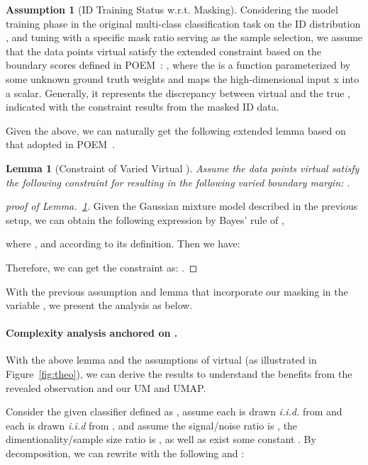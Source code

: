 \documentclass{article}
\theoremstyle{plain}
\newtheorem{lemma}[theorem]{Lemma}
\theoremstyle{definition}
\newtheorem{assumption}[theorem]{Assumption}
\theoremstyle{remark}
\begin{document}
\begin{assumption}[ID Training Status w.r.t. Masking]
Considering the model training phase in the original multi-class classification task on the ID distribution , and tuning with a specific mask ratio serving as the sample selection, we assume that the data points  virtual  satisfy the extended constraint based on the boundary scores  defined in POEM~\cite{ming2022poem}: , where the  is a function parameterized by some unknown ground truth weights and maps the high-dimensional input x into a scalar. Generally, it represents the discrepancy between virtual  and the true , indicated with the constraint  results from the masked ID data.
\label{assump:masking}
\end{assumption}

Given the above, we can naturally get the following extended lemma based on that adopted in POEM~\citep{ming2022poem}.

\begin{lemma}[Constraint of Varied Virtual ]
\label{app: lemma1}
Assume the data points  virtual  satisfy the following constraint for resulting in the following varied boundary margin: . 
\end{lemma}

\begin{proof}[proof of Lemma.~\ref{app: lemma1}]
Given the Gaussian mixture model described in the previous setup, we can obtain the following expression by Bayes' rule of ,

where , and  according to its definition. Then we have:

Therefore, we can get the constraint as: .
\end{proof}


With the previous assumption and lemma that incorporate our masking in the variable , we present the analysis as below.

\paragraph{Complexity analysis anchored on .} With the above lemma and the assumptions of virtual  (as illustrated in Figure~\ref{fig:theo}), we can derive the results to understand the benefits from the revealed observation and our UM and UMAP.

Consider the given classifier defined as , assume each  is drawn \textit{i.i.d.} from  and each  is drawn \textit{i.i.d} from , and assume the signal/noise ratio is , the dimentionality/sample size ratio is , as well as exist some constant . By decomposition, we can rewrite  with the following  and :
\end{document}
